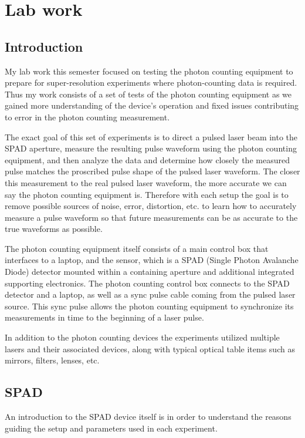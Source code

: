 \documentclass[a4paper]{article}
\begin{document}
\section{Lab work}

\subsection{Introduction}

My lab work this semester focused on testing the photon counting equipment to prepare for super-resolution experiments where photon-counting data is required. Thus my work consists of a set of tests of the photon counting equipment as we gained more understanding of the device's operation and fixed issues contributing to error in the photon counting measurement.

The exact goal of this set of experiments is to direct a pulsed laser beam into the SPAD aperture, measure the resulting pulse waveform using the photon counting equipment, and then analyze the data and determine how closely the measured pulse matches the proscribed pulse shape of the pulsed laser waveform. The closer this measurement to the real pulsed laser waveform, the more accurate we can say the photon counting equipment is. Therefore with each setup the goal is to remove possible sources of noise, error, distortion, etc. to learn how to accurately measure a pulse waveform so that future measurements can be as accurate to the true waveforms as possible.

The photon counting equipment itself consists of a main control box that interfaces to a laptop, and the sensor, which is a SPAD (Single Photon Avalanche Diode) detector mounted within a containing aperture and additional integrated supporting electronics. The photon counting control box connects to the SPAD detector and a laptop, as well as a sync pulse cable coming from the pulsed laser source. This sync pulse allows the photon counting equipment to synchronize its measurements in time to the beginning of a laser pulse.

In addition to the photon counting devices the experiments utilized multiple lasers and their associated devices, along with typical optical table items such as mirrors, filters, lenses, etc.

\subsection{SPAD}

An introduction to the SPAD device itself is in order to understand the reasons guiding the setup and parameters used in each experiment.
\end{document}
